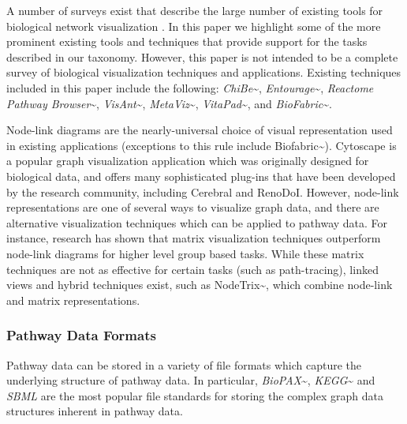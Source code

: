 A number of surveys exist that describe the large number of existing tools for biological network visualization \cite{Suderman2007tools,pavlopoulos2008survey,Gehlenborg2010omics}.
In this paper we highlight some of the more prominent existing tools and techniques that provide support for the tasks described in our taxonomy.
However, this paper is not intended to be a complete survey of biological visualization techniques and applications.
Existing techniques included in this paper include the following: \textit{ChiBe}\textasciitilde{}\cite{Babur2010chibe}, \textit{Entourage}\textasciitilde{}\cite{Lex2013entourage}, \textit{Reactome Pathway Browser}\textasciitilde{}\cite{croft2014reactome}, \textit{VisAnt}\textasciitilde{}\cite{hu2004visant}, \textit{MetaViz}\textasciitilde{}\cite{bourqui2007metabolic}, \textit{VitaPad}\textasciitilde{}\cite{holford2005vitapad}, and \textit{BioFabric}\textasciitilde{}\cite{Longabaugh2012biofabric}.

Node-link diagrams are the nearly-universal choice of visual representation used in existing applications (exceptions to this rule include Biofabric\textasciitilde{}\cite{Longabaugh2012biofabric}).
Cytoscape \cite{cytoscape} is a popular graph visualization application which was originally designed for biological data, and offers many sophisticated plug-ins that have been developed by the research community, including Cerebral\cite{Barsky2008cerebral} and RenoDoI\cite{Vehlow2015}.
However, node-link representations are one of several ways to visualize graph data, and there are alternative visualization techniques which can be applied to pathway data.
For instance, research has shown that matrix visualization techniques outperform node-link diagrams for higher level group based tasks\cite{Ghoniem2004,Henry2007}.
While these matrix techniques are not as effective for certain tasks (such as path-tracing), linked views and hybrid techniques exist, such as NodeTrix\textasciitilde{}\cite{NodeTrix2007}, which combine node-link and matrix representations.

\subsubsection*{Pathway Data Formats}

Pathway data can be stored in a variety of file formats which capture the underlying structure of pathway data.
In particular, \textit{BioPAX}\textasciitilde{}\cite{demir2010biopax}, \textit{KEGG}\textasciitilde{}\cite{kanehisa2000kegg} and \textit{SBML} \cite{Hucka2003} are the most popular file standards for storing the complex graph data structures inherent in pathway data.

